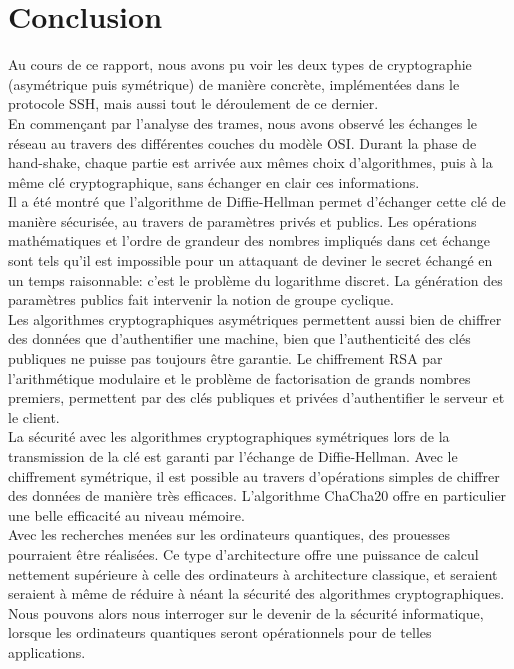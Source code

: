 \chapter{Conclusion}
Au cours de ce rapport, nous avons pu voir les deux types de cryptographie (asymétrique puis symétrique) de manière concrète, implémentées dans le protocole SSH, mais aussi tout le déroulement de ce dernier.\\

En commençant par l'analyse des trames, nous avons observé les échanges le réseau au travers des différentes couches du modèle OSI. Durant la phase de hand-shake, chaque partie est arrivée aux mêmes choix d'algorithmes, puis à la même clé cryptographique, sans échanger \og en clair \fg ces informations.\\

Il a été montré que l'algorithme de Diffie-Hellman permet d'échanger cette clé de manière sécurisée, au travers de paramètres privés et publics. Les opérations mathématiques et l'ordre de grandeur des nombres impliqués dans cet échange sont tels qu'il est impossible pour un attaquant de deviner le secret échangé en un temps raisonnable: c'est le problème du logarithme discret. La génération des paramètres publics fait intervenir la notion de groupe cyclique.\\

Les algorithmes cryptographiques asymétriques permettent aussi bien de chiffrer des données que d'authentifier une machine, bien que l'authenticité des clés publiques ne puisse pas toujours être garantie. Le chiffrement RSA par l'arithmétique modulaire et le problème de factorisation de grands nombres premiers, permettent par des clés publiques et privées d'authentifier le serveur et le client.\\

La sécurité avec les algorithmes cryptographiques symétriques lors de la transmission de la clé est garanti par l'échange de Diffie-Hellman. Avec le chiffrement symétrique, il est possible au travers d'opérations simples de chiffrer des données de manière très efficaces. L'algorithme {\ttfamily ChaCha20} offre en particulier une belle efficacité au niveau mémoire.\\

Avec les recherches menées sur les ordinateurs quantiques, des prouesses pourraient être réalisées. Ce type d'architecture offre une puissance de calcul nettement supérieure à celle des ordinateurs à architecture classique, et seraient seraient à même de réduire à néant la sécurité des algorithmes cryptographiques. Nous pouvons alors nous interroger sur le devenir de la sécurité informatique, lorsque les ordinateurs quantiques seront opérationnels pour de telles applications.